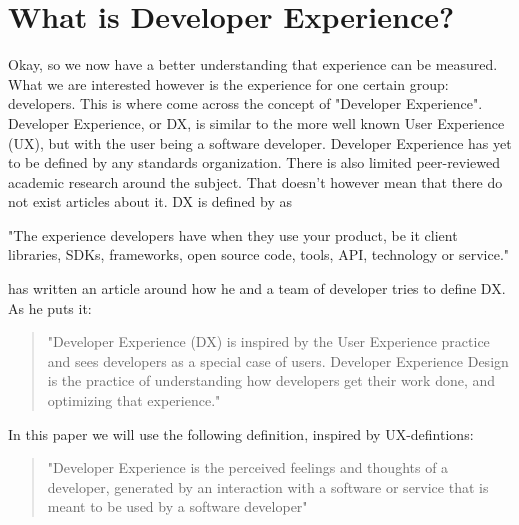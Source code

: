 \documentclass{cslthse-msc}
\begin{document}
    \section{What is Developer Experience?}
    Okay, so we now have a better understanding that experience can be measured. What we are interested however is the experience for one certain group: developers. This is where come across the concept of "Developer Experience". Developer Experience, or DX, is similar to the more well known User
    Experience (UX), but with the user being a software developer. Developer Experience has yet to be defined by any standards organization. There is also limited peer-reviewed academic research around the subject. That doesn't however mean that there do not exist articles about it. DX is
    defined by \citet{jarman} as
    \begin{displayquote}
        "The experience developers have when they use your product, be it
        client libraries, SDKs, frameworks, open source code, tools, API,
        technology or service."
    \end{displayquote}
    \citet{dhide} has written an article around how he and a team of developer tries to define DX. As he puts it:
    \begin{quote}
        "Developer Experience (DX) is inspired by the User Experience practice and sees developers as a special case of users. Developer Experience Design is the practice of understanding how developers get their work done, and optimizing that experience."
    \end{quote}
    In this paper we will use the following definition, inspired by UX-defintions:
    \begin{quote}
        "Developer Experience is the perceived feelings and thoughts of a developer, generated by an interaction with a software or service that is meant to be used by a software developer"
    \end{quote}
\end{document}
